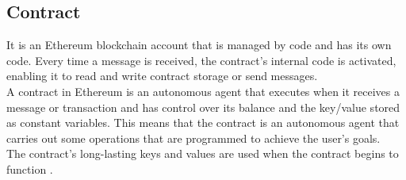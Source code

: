 \subsection{Contract}
It is an Ethereum blockchain account that is managed by code and has its own code. Every time a message is received, the contract's internal code is activated, enabling it to read and write contract storage or send messages.\\
A contract in Ethereum is an autonomous agent that executes when it receives a message or transaction and has control over its balance and the key/value stored as constant variables. This means that the contract is an autonomous agent that carries out some operations that are programmed to achieve the user's goals. \\
The contract's long-lasting keys and values are used when the contract begins to function \cite{Egbertsen}.
